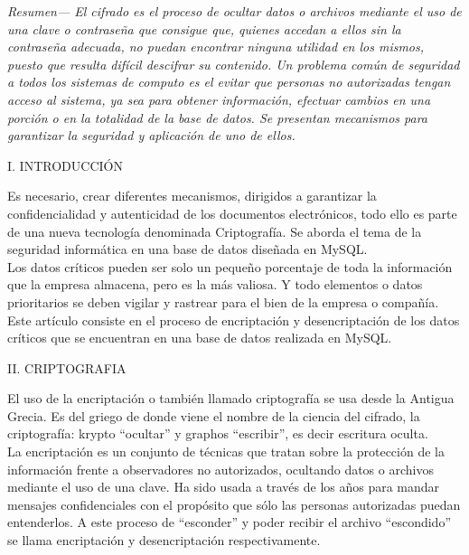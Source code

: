 \documentclass[9pt,24pt,twocolumn]{article}
\author{Caro Diaz Juan, Correa Barcos Valentina, Restrepo Aguilera Yulissa
\\
\\
\textit{Facultad de Ingeniería, Universidad Tecnológica de Bolívar}
\\
{\textit{Cartagena, Bolívar}}
\\
\\{\small {juandiaz7289@gmail.com}}
\\{\small {valencorreabarco@hotmail.com}}
\\{\small {yulissatatiana@gmail.com}}
}
\date {}
{\title{{\Huge ENCRIPTACIÓN Y DESENCRIPTACIÓN DE DATOS}}}
\begin{document}
\maketitle

\emph{Resumen— El cifrado es el proceso de ocultar datos o archivos mediante el uso de una clave o contraseña que consigue que, quienes accedan a ellos sin la contraseña adecuada, no puedan encontrar ninguna utilidad en los mismos, puesto que resulta difícil descifrar su contenido. Un problema común de seguridad a todos los sistemas de computo es el evitar que personas no autorizadas tengan acceso  al   sistema, ya   sea  para  obtener   información, efectuar cambios en una porción o en la totalidad de la base de datos. Se presentan mecanismos para garantizar la seguridad y aplicación de uno de ellos.}
\\

\begin{center}
{I. INTRODUCCIÓN}
\end{center}

{Es necesario, crear diferentes mecanismos, dirigidos a garantizar la confidencialidad y autenticidad de los documentos electrónicos, todo ello es parte de una nueva tecnología denominada Criptografía. Se aborda el tema de la seguridad informática en una base de datos diseñada en MySQL.}
\\

{Los datos críticos pueden ser solo un pequeño porcentaje de toda la información que la empresa almacena, pero es la más valiosa. Y todo elementos o datos prioritarios se deben vigilar y rastrear para el bien de la empresa o compañía.}
\\

{Este artículo consiste en el proceso de encriptación y desencriptación de los datos críticos que se encuentran en una base de datos realizada en MySQL.}
\\

\begin{center}
{II. CRIPTOGRAFIA}
\end{center}

{El uso de la encriptación o también llamado criptografía se usa desde la Antigua Grecia. Es del griego de donde viene el nombre de la ciencia del cifrado, la criptografía: krypto “ocultar” y graphos “escribir”, es decir escritura oculta.}
\\

{La encriptación es un conjunto de técnicas que tratan sobre la protección de la información frente a observadores no autorizados, ocultando datos o archivos mediante el uso de una clave. Ha sido usada a través de los años para mandar mensajes confidenciales con el propósito que sólo las personas autorizadas puedan entenderlos. A este proceso de “esconder” y poder recibir el archivo “escondido” se llama encriptación y desencriptación respectivamente.}
\\
\end{document}
